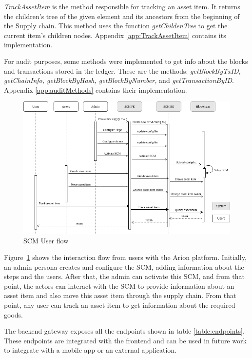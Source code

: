 \textit{TrackAssetItem} is the method responsible for tracking an asset item. It returns the children's tree of the given element and its ancestors from the beginning of the Supply chain. This method uses the function \textit{getChildenTree} to get the current item's children nodes. Appendix \ref{app:TrackAssetItem} contains its implementation.

For audit purposes, some methods were implemented to get info about the blocks and transactions stored in the ledger. These are the methods: \textit{getBlockByTxID, getChainInfo, getBlockByHash, getBlockByNumber,} and \textit{getTransactionByID}. Appendix \ref{app:auditMethods} contains their implementation.

\begin{figure}[ht]
\begin{center}
  \includegraphics[scale=0.5]{images/SequenceDiagram.png}
\caption{SCM User flow}
\label{fig:sequenceDiagram}
\end{center}
\end{figure}

Figure~\ref{fig:sequenceDiagram} shows the interaction flow from users with the Arion platform. Initially, an admin persona creates and configure the SCM, adding information about the steps and the users. After that, the admin can activate this SCM, and from that point, the actors can interact with the SCM to provide information about an asset item and also move this asset item through the supply chain. From that point, any user can track an asset item to get information about the required goods.

The backend gateway exposes all the endpoints shown in table \ref{table:endpoints}. These endpoints are integrated with the frontend and can be used in future work to integrate with a mobile app or an external application.


